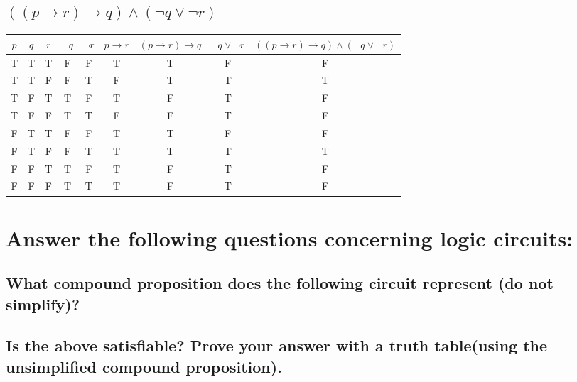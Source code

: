 \documentclass{article}
\begin{document}
    \subsection{\texorpdfstring{$((p \to r) \to q) \wedge (\neg q \vee \neg r)$}{((p → r) → q) ∧ (¬q ∨ ¬r)}} 
        \begin{center}
            \begin{tabular}{|c|c|c|c|c|c|c|c|c|}
                \hline
                $p$ & $q$ & $r$ & $\neg q$ & $\neg r$ & $p \to r$ & $(p \to r) \to q$ & $\neg q \vee \neg r$ & $((p \to r) \to q) \wedge (\neg q \vee \neg r)$ \\
                \hline
                T & T & T & F & F & T & T & F & F \\
                T & T & F & F & T & F & T & T & T \\
                T & F & T & T & F & T & F & T & F \\  
                T & F & F & T & T & F & F & T & F \\
                F & T & T & F & F & T & T & F & F \\
                F & T & F & F & T & T & T & T & T \\
                F & F & T & T & F & T & F & T & F \\
                F & F & F & T & T & T & F & T & F \\
                \hline
            \end{tabular}
        \end{center}

\section{Answer the following questions concerning logic circuits:}
    \subsection{What compound proposition does the following circuit represent (do not simplify)?} 
    \subsection{Is the above satisfiable? Prove your answer with a truth table(using the unsimplified compound proposition).} 
\end{document}
